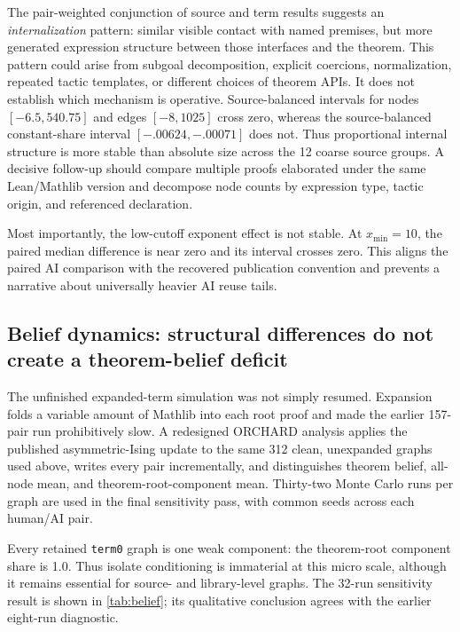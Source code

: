 \documentclass[11pt]{article}
\newcommand{\code}[1]{\texttt{#1}}
\newcommand{\xmin}{x_{\min}}
\begin{document}
The pair-weighted conjunction of source and term results suggests an \emph{internalization}
pattern: similar
visible contact with named premises, but more generated expression structure between those
interfaces and the theorem.  This pattern could arise from subgoal decomposition, explicit
coercions, normalization, repeated tactic templates, or different choices of theorem APIs.  It
does not establish which mechanism is operative.  Source-balanced intervals for nodes
$[-6.5,540.75]$ and edges $[-8,1025]$ cross zero, whereas the source-balanced constant-share
interval $[-.00624,-.00071]$ does not.  Thus proportional internal structure is more stable than
absolute size across the 12 coarse source groups.  A decisive follow-up should compare multiple
proofs elaborated under the same Lean/Mathlib version and decompose node counts by expression type,
tactic origin, and referenced declaration.

Most importantly, the low-cutoff exponent effect is not stable.  At $\xmin=10$, the paired median
difference is near zero and its interval crosses zero.  This aligns the paired AI comparison with
the recovered publication convention and prevents a narrative about universally heavier AI reuse
tails.

\subsection{Belief dynamics: structural differences do not create a theorem-belief deficit}

The unfinished expanded-term simulation was not simply resumed.  Expansion folds a variable amount
of Mathlib into each root proof and made the earlier 157-pair run prohibitively slow.  A redesigned
ORCHARD analysis applies the published asymmetric-Ising update to the same 312 clean, unexpanded
graphs used above, writes every pair incrementally, and distinguishes theorem belief, all-node mean,
and theorem-root-component mean.  Thirty-two Monte Carlo runs per graph are used in the final
sensitivity pass, with common seeds across each human/AI pair.

Every retained \code{term0} graph is one weak component: the theorem-root component share is 1.0.
Thus isolate conditioning is immaterial at this micro scale, although it remains essential for
source- and library-level graphs.  The 32-run sensitivity result is shown in
\cref{tab:belief}; its qualitative conclusion agrees with the earlier eight-run diagnostic.
\end{document}
